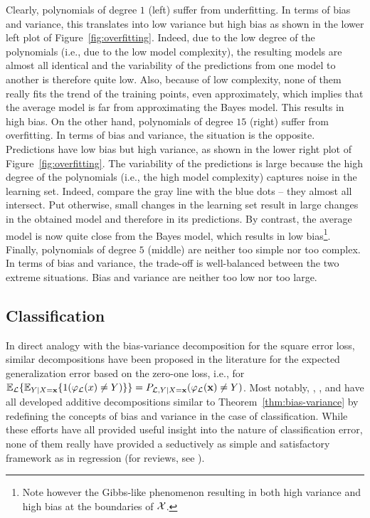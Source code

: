 Clearly, polynomials of degree $1$ (left) suffer from underfitting. In terms of
bias and variance, this translates into low variance but high bias as shown in
the lower left plot of Figure~\ref{fig:overfitting}. Indeed, due to the low
degree of the polynomials (i.e., due to the low model complexity), the
resulting models are almost all identical and  the variability of the
predictions from one model to another is therefore quite low. Also, because of
low complexity, none of them really fits the trend of the training points, even
approximately, which implies that the average model is far from approximating
the Bayes model. This results in high bias. On the other hand, polynomials of
degree $15$ (right) suffer from overfitting. In terms of bias and variance, the
situation is the opposite. Predictions have low bias but high variance, as
shown in the lower right plot of Figure~\ref{fig:overfitting}. The variability
of the predictions is large because the high degree of the polynomials (i.e.,
the high model complexity) captures noise in the learning set. Indeed, compare
the gray line with the blue dots -- they almost all intersect. Put otherwise,
small changes in the learning set result in large changes in the obtained model
and therefore in its predictions. By contrast, the average model is now quite
close from the Bayes model, which results in low bias\footnote{Note however the
Gibbs-like phenomenon resulting in both high variance and high bias at the
boundaries of ${\cal X}$.}. Finally, polynomials of degree $5$ (middle) are
neither too simple nor too complex. In terms of bias and variance, the trade-off
is well-balanced between the two extreme situations. Bias and variance are
neither too low nor too large.


\subsection{Classification}
\label{sec:bias-variance:classification}

In direct analogy with the bias-variance decomposition for the square error
loss, similar decompositions have been proposed in the literature for the
expected generalization error based on the zero-one loss, i.e., for
$\mathbb{E}_{\cal L}\{ \mathbb{E}_{Y|X=\mathbf{x}} \{ 1(\varphi_{\cal L}(x)
\neq Y) \} \} = P_{{\cal L},Y|X=\mathbf{x}}(\varphi_{\cal L}(\mathbf{x}) \neq
Y)$. Most notably, \citet{dietterich:1995}, \citet{breiman:1996},
\citet{kohavi:1996} and \citet{tibshirani:1996} have all developed additive
decompositions similar to Theorem~\ref{thm:bias-variance} by redefining the
concepts of bias and variance in the case of classification. While these
efforts have all provided useful insight into the nature of classification
error, none of them really have provided a seductively as simple and
satisfactory framework as in regression (for reviews, see
\citep{friedman:1997,geurts:2002,james:2003}).

